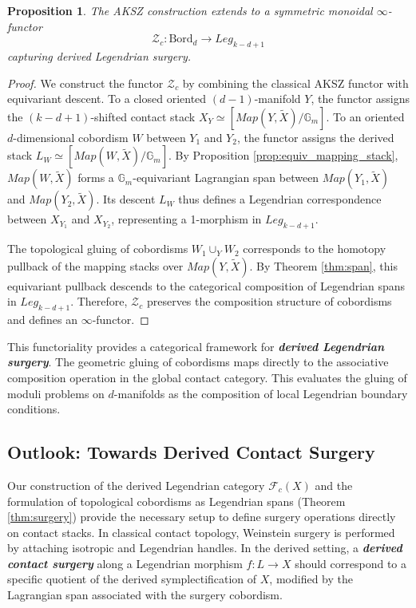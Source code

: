 \documentclass[reqno]{amsart}
\newcommand{\bfem}[1]{\textbf{\textit{#1}}}
\newcommand{\Gm}{\mathbb{G}_m}
\newtheorem{proposition}[theorem]{Proposition}
\begin{document}
\begin{proposition} \label{prop:AKSZ}
The AKSZ construction extends to a symmetric monoidal $\infty$-functor \[ \mathcal{Z}_{c} \colon \mathrm{Bord}_d \to Leg_{k-d+1} \] capturing derived Legendrian surgery.
\end{proposition}
\begin{proof}
We construct the functor $\mathcal{Z}_{c}$ by combining the classical AKSZ functor with equivariant descent. To a closed oriented $(d-1)$-manifold $Y$, the functor assigns the $(k-d+1)$-shifted contact stack $X_Y \simeq [Map(Y, \widetilde{X}) / \Gm]$. To an oriented $d$-dimensional cobordism $W$ between $Y_1$ and $Y_2$, the functor assigns the derived stack $L_W \simeq [Map(W, \widetilde{X}) / \Gm]$. By Proposition \ref{prop:equiv_mapping_stack}, $Map(W, \widetilde{X})$ forms a $\Gm$-equivariant Lagrangian span between $Map(Y_1, \widetilde{X})$ and $Map(Y_2, \widetilde{X})$. Its descent $L_W$ thus defines a Legendrian correspondence between $X_{Y_1}$ and $X_{Y_2}$, representing a 1-morphism in $Leg_{k-d+1}$.

The topological gluing of cobordisms $W_1 \cup_Y W_2$ corresponds to the homotopy pullback of the mapping stacks over $Map(Y, \widetilde{X})$. By Theorem \ref{thm:span}, this equivariant pullback descends to the categorical composition of Legendrian spans in $Leg_{k-d+1}$. Therefore, $\mathcal{Z}_{c}$ preserves the composition structure of cobordisms and defines an $\infty$-functor.

\end{proof}

This functoriality provides a categorical framework for \bfem{derived Legendrian surgery}. The geometric gluing of cobordisms maps directly to the associative composition operation in the global contact category. This evaluates the gluing of moduli problems on $d$-manifolds as the composition of local Legendrian boundary conditions.

\subsection{Outlook: Towards Derived Contact Surgery}
Our construction of the derived Legendrian category $\mathcal{F}_{c}(X)$ and the formulation of topological cobordisms as Legendrian spans (Theorem \ref{thm:surgery}) provide the necessary setup to define surgery operations directly on contact stacks. In classical contact topology, Weinstein surgery is performed by attaching isotropic and Legendrian handles. In the derived setting, a \bfem{derived contact surgery} along a Legendrian morphism $f \colon L \to X$ should correspond to a specific quotient of the derived symplectification of $X$, modified by the Lagrangian span associated with the surgery cobordism. 
\end{document}
